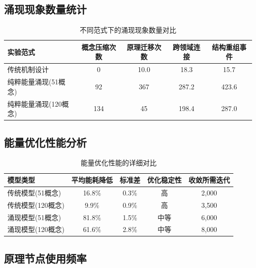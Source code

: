 \documentclass[12pt,a4paper]{article}
\begin{document}
\subsection{涌现现象数量统计}

\begin{table}[H]
\centering
\caption{不同范式下的涌现现象数量对比}
\label{tab:emergence_quantity_comparison}
\begin{tabular}{p{3cm}cccc}
\toprule
\textbf{实验范式} & \textbf{概念压缩次数} & \textbf{原理迁移次数} & \textbf{跨领域连接} & \textbf{结构重组事件} \\
\midrule
传统机制设计 & 0 & 10.0 & 18.3 & 15.7 \\
纯粹能量涌现(51概念) & 92 & 367 & 287.2 & 423.6 \\
纯粹能量涌现(120概念) & 134 & 45 & 198.4 & 287.0 \\
\bottomrule
\end{tabular}
\end{table}

\subsection{能量优化性能分析}

\begin{table}[H]
\centering
\caption{能量优化性能的详细对比}
\label{tab:energy_optimization_detailed}
\begin{tabular}{p{3cm}cccc}
\toprule
\textbf{模型类型} & \textbf{平均能耗降低} & \textbf{标准差} & \textbf{优化稳定性} & \textbf{收敛所需迭代} \\
\midrule
传统模型(51概念) & 16.8\% & 0.3\% & 高 & 2,000 \\
传统模型(120概念) & 9.9\% & 0.9\% & 高 & 3,500 \\
涌现模型(51概念) & 81.8\% & 1.5\% & 中等 & 6,000 \\
涌现模型(120概念) & 61.6\% & 2.8\% & 中等 & 8,000 \\
\bottomrule
\end{tabular}
\end{table}

\subsection{原理节点使用频率}
\end{document}
